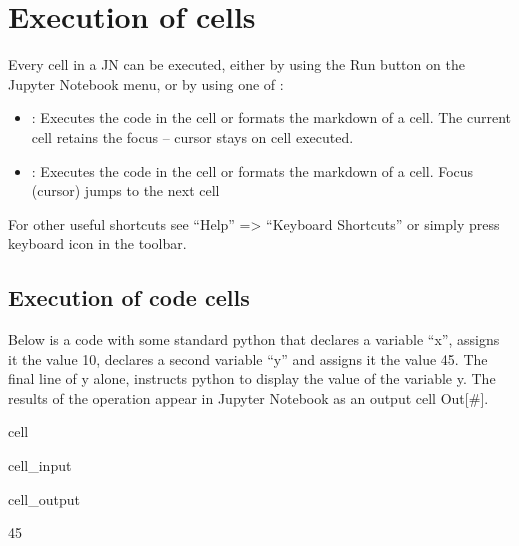 \documentclass[letterpaper,10pt,english]{jupyterBook}
\begin{document}
\section{Execution of cells}
\label{\detokenize{content/04_PythonEssentials/Intro_Jupyter_notebook:execution-of-cells}}
\sphinxAtStartPar
Every cell in a JN can be executed, either by using the Run button on the Jupyter Notebook menu, or by using one of :
\begin{itemize}
\item {} 
\sphinxAtStartPar
{}: Executes the code in the cell or formats the markdown of a cell.  The current cell retains the focus – cursor stays on cell executed.

\item {} 
\sphinxAtStartPar
{}: Executes the code in the cell or formats the markdown of a cell. Focus (cursor) jumps to the next cell

\end{itemize}

\sphinxAtStartPar
For other useful shortcuts see “Help” => “Keyboard Shortcuts” or simply press keyboard icon in the toolbar.


\subsection{Execution of code cells}
\label{\detokenize{content/04_PythonEssentials/Intro_Jupyter_notebook:execution-of-code-cells}}
\sphinxAtStartPar
Below is a code with some standard python that declares a variable “x”, assigns it the value 10, declares a second variable “y” and assigns it the value 45.  The final line of y alone, instructs python to display the value of the variable y.  The results of the operation appear in Jupyter Notebook as an output cell Out{[}\#{]}.

\begin{sphinxuseclass}{cell}\begin{sphinxVerbatimInput}

\begin{sphinxuseclass}{cell_input}
\begin{sphinxVerbatim}[commandchars=\\\{\}]
  
  
\end{sphinxVerbatim}

\end{sphinxuseclass}\end{sphinxVerbatimInput}
\begin{sphinxVerbatimOutput}

\begin{sphinxuseclass}{cell_output}
\begin{sphinxVerbatim}[commandchars=\\\{\}]
45
\end{sphinxVerbatim}

\end{sphinxuseclass}\end{sphinxVerbatimOutput}

\end{sphinxuseclass}
\end{document}
